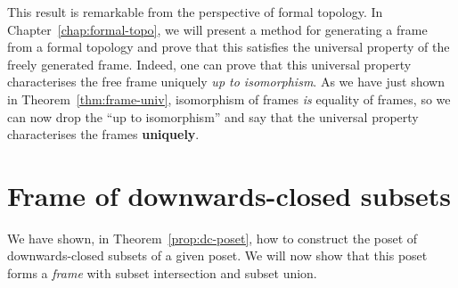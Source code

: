 \begin{thm}\label{thm:frame-univ}
\end{thm}

This result is remarkable from the perspective of formal topology. In
Chapter~\ref{chap:formal-topo}, we will present a method for generating a frame from a
formal topology and prove that this satisfies the universal property of the freely
generated frame. Indeed, one can prove that this universal property characterises the free
frame uniquely \emph{up to isomorphism}. As we have just shown in
Theorem~\ref{thm:frame-univ}, isomorphism of frames \emph{is} equality of frames, so we
can now drop the ``up to isomorphism'' and say that the universal property characterises
the frames \textbf{uniquely}.

\vspace{\baselineskip}
\noindent{}

\section{Frame of downwards-closed subsets}\label{sec:down-set-frame}

We have shown, in Theorem~\ref{prop:dc-poset}, how to construct the poset of
downwards-closed subsets of a given poset. We will now show that this poset forms a
\emph{frame} with subset intersection and subset union.

